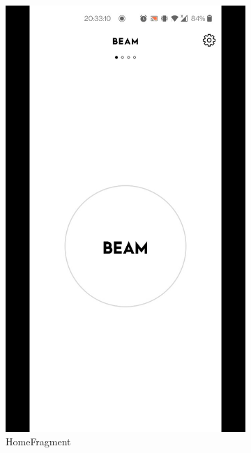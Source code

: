 \documentclass[../report.tex]{subfiles}
\begin{document}
\begin{figure} [H]
	\centering
	\begin{subfigure}[b]{0.28\textwidth}
		\centering
		\includegraphics[width=\textwidth]{../images/07/02-app-home.jpg}
		\caption{HomeFragment}
		\label{fig:app-home-frag}
	\end{subfigure}
	\hspace{0.1\textwidth}
	\begin{subfigure}[b]{0.28\textwidth}
		\centering

\end{subfigure}
\end{figure}
\end{document}
